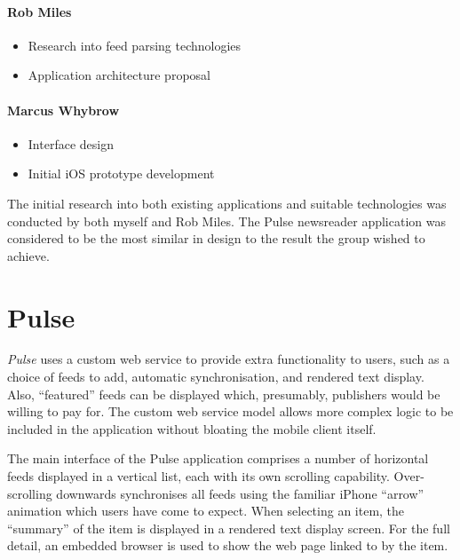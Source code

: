 \documentclass[a4paper,11pt]{article}
\begin{document}
    \paragraph{Rob Miles}

    \begin{itemize}
        \item Research into feed parsing technologies
        \item Application architecture proposal
    \end{itemize}

    \paragraph{Marcus Whybrow}

    \begin{itemize}
        \item Interface design
        \item Initial iOS prototype development
    \end{itemize}

    The initial research into both existing applications and suitable
    technologies was conducted by both myself and Rob Miles. The Pulse
    newsreader application was considered to be the most similar in design to
    the result the group wished to achieve.

    \section{Pulse}

    \emph{Pulse} uses a custom web service to provide extra functionality to
    users, such as a choice of feeds to add, automatic synchronisation, and
    rendered text display. Also, ``featured'' feeds can be displayed which,
    presumably, publishers would be willing to pay for. The custom web service
    model allows more complex logic to be included in the application without
    bloating the mobile client itself.

    The main interface of the Pulse application comprises a number of
    horizontal feeds displayed in a vertical list, each with its own scrolling
    capability. Over-scrolling downwards synchronises all feeds using the
    familiar iPhone ``arrow'' animation which users have come to expect. When
    selecting an item, the ``summary'' of the item is displayed in a rendered
    text display screen. For the full detail, an embedded browser is used to
    show the web page linked to by the item.
\end{document}
